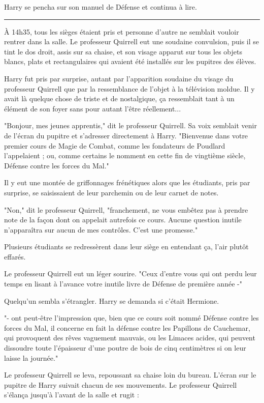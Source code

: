 Harry se pencha sur son manuel de Défense et continua à lire.
\par\noindent\rule{\textwidth}{0.4pt}
À 14h35, tous les sièges étaient pris et personne d'autre ne semblait vouloir rentrer dans la salle. Le professeur Quirrell eut une soudaine convulsion, puis il se tint le dos droit, assis sur sa chaise, et son visage apparut sur tous les objets blancs, plats et rectangulaires qui avaient été installés sur les pupitres des élèves.

Harry fut pris par surprise, autant par l'apparition soudaine du visage du professeur Quirrell que par la ressemblance de l'objet à la télévision moldue. Il y avait là quelque chose de triste et de nostalgique, ça ressemblait tant à un élément de son foyer sans pour autant l'être réellement...

"Bonjour, mes jeunes apprentis," dit le professeur Quirrell. Sa voix semblait venir de l'écran du pupitre et s'adresser directement à Harry. "Bienvenue dans votre premier cours de Magie de Combat, comme les fondateurs de Poudlard l'appelaient ; ou, comme certains le nomment en cette fin de vingtième siècle, Défense contre les forces du Mal."

Il y eut une montée de griffonnages frénétiques alors que les étudiants, pris par surprise, se saisissaient de leur parchemin ou de leur carnet de notes.

"Non," dit le professeur Quirrell, "franchement, ne vous embêtez pas à prendre note de la façon dont on appelait autrefois ce cours. Aucune question inutile n'apparaîtra sur aucun de mes contrôles. C'est une promesse."

Plusieurs étudiants se redressèrent dans leur siège en entendant ça, l'air plutôt effarés.

Le professeur Quirrell eut un léger sourire. "Ceux d'entre vous qui ont perdu leur temps en lisant à l'avance votre inutile livre de Défense de première année -"

Quelqu'un sembla s'étrangler. Harry se demanda si c'était Hermione.

"- ont peut-être l'impression que, bien que ce cours soit nommé Défense contre les forces du Mal, il concerne en fait la défense contre les Papillons de Cauchemar, qui provoquent des rêves vaguement mauvais, ou les Limaces acides, qui peuvent dissoudre toute l'épaisseur d'une poutre de bois de cinq centimètres si on leur laisse la journée."

Le professeur Quirrell se leva, repoussant sa chaise loin du bureau. L'écran sur le pupitre de Harry suivait chacun de ses mouvements. Le professeur Quirrell s'élança jusqu'à l'avant de la salle et rugit :

